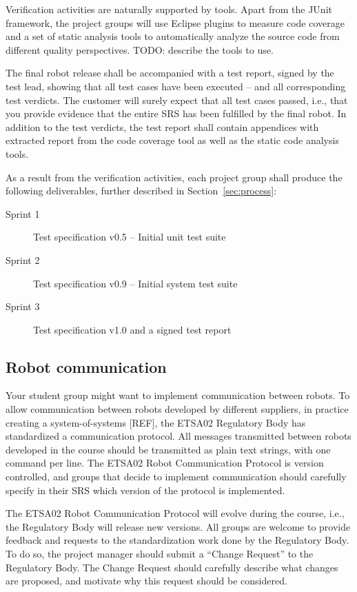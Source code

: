 \documentclass{scrreprt}
\begin{document}
Verification activities are naturally supported by tools. Apart from the JUnit framework, the project groups will use Eclipse plugins to measure code coverage and a set of static analysis tools to automatically analyze the source code from different quality perspectives. TODO: describe the tools to use.

The final robot release shall be accompanied with a test report, signed by the test lead, showing that all test cases have been executed -- and all corresponding test verdicts. The customer will surely expect that all test cases passed, i.e., that you provide evidence that the entire SRS has been fulfilled by the final robot. In addition to the test verdicts, the test report shall contain appendices with extracted report from the code coverage tool as well as the static code analysis tools.

As a result from the verification activities, each project group shall produce the following deliverables, further described in Section~\ref{sec:process}:
\begin{description}
\item[Sprint 1] Test specification v0.5 -- Initial unit test suite
\item[Sprint 2] Test specification v0.9 -- Initial system test suite
\item[Sprint 3] Test specification v1.0 and a signed test report
\end{description}

\subsection{Robot communication}
Your student group might want to implement communication between robots. To allow communication between robots developed by different suppliers, in practice creating a system-of-systems [REF], the ETSA02 Regulatory Body has standardized a communication protocol. All messages transmitted between  robots developed in the course should be transmitted as plain text strings, with one command per line. The ETSA02 Robot Communication Protocol is version controlled, and groups that decide to implement communication should carefully specify in their SRS which version of the protocol is implemented.

The ETSA02 Robot Communication Protocol will evolve during the course, i.e., the Regulatory Body will release new versions. All groups are welcome to provide feedback and requests to the standardization work done by the Regulatory Body. To do so, the project manager should submit a ``Change Request'' to the Regulatory Body. The Change Request should carefully describe what changes are proposed, and motivate why this request should be considered.
\end{document}
